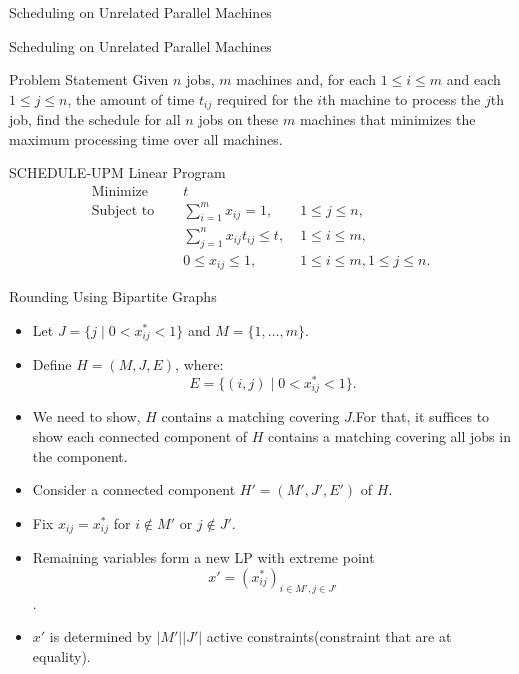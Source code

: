 \documentclass[xcolor=svgnames]{beamer}
\begin{document}
\begin{section}{Scheduling on Unrelated Parallel Machines}
    \small
    \begin{frame}{Scheduling on Unrelated Parallel Machines}
        \begin{block}{Problem Statement}
            Given $n$ jobs, $m$ machines and, for each $1 \leq i \leq m$ and each $1 \leq j \leq n$, the amount of time $t_{ij}$ required for the $i$th machine to process the $j$th job, find the schedule for all $n$ jobs on these $m$ machines that minimizes the maximum processing time over all machines.
        \end{block}
        \pause
        \begin{exampleblock}{SCHEDULE-UPM Linear Program}
        \[
            \begin{aligned}
                \text{Minimize } & \; \quad t \\
                \text{Subject to} & \; \quad \sum_{i=1}^m x_{ij} = 1, &\; 1\leq j \leq n, \\
                & \; \quad  \sum_{j=1}^n x_{ij} t_{ij} \leq t,& \; 1\leq i \leq m, \\
                & \; \quad  0\leq x_{ij} \leq 1, &\; 1\leq i \leq m,  1\leq j \leq n.
            \end{aligned}
            \]
        \end{exampleblock}
    \end{frame}
\begin{frame}{Rounding Using Bipartite Graphs}
    \begin{itemize}[<+->]
        \item Let \(J = \{j \mid 0 < x_{ij}^* < 1\}\) and \(M = \{1, \dots, m\}\).
        \item Define \(H = (M, J, E)\), where:
        \[
        E = \{(i, j) \mid 0 < x_{ij}^* < 1\}.
        \]
        \item We need to show, $H$ contains a matching covering $J$.For that, it suffices to show each connected component of $H$ contains a matching covering all jobs in the component.
        \item Consider a connected component $H' = (M', J', E')$ of $H$.
        \item Fix $x_{ij} = x^*_{ij}$ for $i \notin M'$ or $j \notin J'$.
        \item Remaining variables form a new LP with extreme point \[x' = (x^*_{ij})_{i \in M', j \in J'}\].
        \vspace{-1.5em}
        \item $x'$ is determined by $|M'||J'|$ active constraints(constraint that are at equality).

\end{itemize}
\end{frame}
\end{section}
\end{document}
